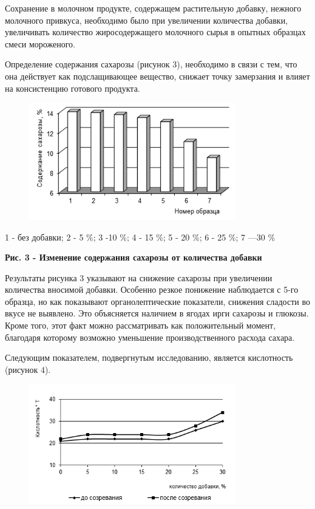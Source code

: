 {{Сохранение в молочном продукте, содержащем растительную добавку, нежного
молочного привкуса, необходимо было при увеличении количества добавки,
увеличивать количество жиросодержащего молочного сырья в опытных
образцах смеси мороженого.

Определение содержания сахарозы (рисунок 3), необходимо в связи с тем,
что она действует как подслащивающее вещество, снижает точку замерзания
и влияет на консистенцию готового продукта.

\begin{figure}[H]
	\centering
	\includegraphics[width=0.8\textwidth]{media/pish2/image12}
	\caption*{}
\end{figure}


1 - без добавки; 2 - 5 \%; 3 -10 \%; 4 - 15 \%; 5 - 20 \%; 6 - 25 \%; 7
---30 \%

{\bfseries Рис. 3 - Изменение содержания сахарозы от количества добавки}

Результаты рисунка 3 указывают на снижение сахарозы при увеличении
количества вносимой добавки. Особенно резкое понижение наблюдается с
5-го образца, но как показывают органолептические показатели, снижения
сладости во вкусе не выявлено. Это объясняется наличием в ягодах ирги
сахарозы и глюкозы. Кроме того, этот факт можно рассматривать как
положительный момент, благодаря которому возможно уменьшение
производственного расхода сахара.

Следующим показателем, подвергнутым исследованию, является кислотность
(рисунок 4).

\begin{figure}[H]
	\centering
	\includegraphics[width=0.8\textwidth]{media/pish2/image13}
	\caption*{}
\end{figure}


}}
